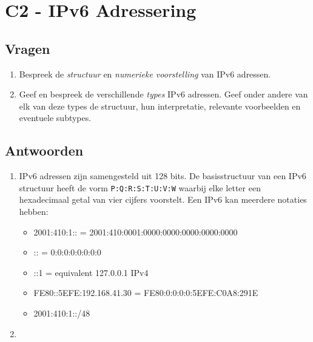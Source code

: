 \documentclass{report}
\begin{document}
\section{C2 - IPv6 Adressering}
\subsection{Vragen}
\begin{enumerate}
\item {Bespreek de \textit{structuur} en \textit{numerieke voorstelling} van IPv6 adressen.}
\item {Geef en bespreek de verschillende \textit{types} IPv6 adressen. Geef onder andere van elk van deze types de structuur, hun interpretatie, relevante voorbeelden en eventuele subtypes.}
\end{enumerate}
\subsection{Antwoorden}
\begin{enumerate}


\item {IPv6 adressen zijn samengesteld uit 128 bits. De basisstructuur van een IPv6 structuur heeft de vorm \texttt{P:Q:R:S:T:U:V:W} waarbij elke letter een hexadecimaal getal van vier cijfers voorstelt. Een IPv6 kan meerdere notaties hebben:
\begin{itemize}
\item 2001:410:1:: = 2001:410:0001:0000:0000:0000:0000:0000
\item :: = 0:0:0:0:0:0:0:0
\item ::1 = equivalent 127.0.0.1 IPv4
\item FE80::5EFE:192.168.41.30 = FE80:0:0:0:0:5EFE:C0A8:291E
\item 2001:410:1::/48
\end{itemize}
}
\item {}
\end{enumerate}
\end{document}
